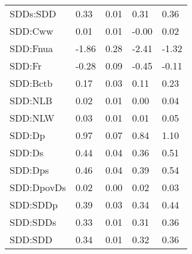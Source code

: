 \begin{center}
\begin{longtable}{|p{0.9in}|p{0.7in}|p{0.7in}|p{0.7in}|p{0.7in}|}
   SDDs:SDD & 0.33 & 0.01 & 0.31 & 0.36 \\ 
   SDD:Cww & 0.01 & 0.01 & -0.00 & 0.02 \\ 
   SDD:Fnua & -1.86 & 0.28 & -2.41 & -1.32 \\ 
   SDD:Fr & -0.28 & 0.09 & -0.45 & -0.11 \\ 
   SDD:Bctb & 0.17 & 0.03 & 0.11 & 0.23 \\ 
   SDD:NLB & 0.02 & 0.01 & 0.00 & 0.04 \\ 
   SDD:NLW & 0.03 & 0.01 & 0.01 & 0.05 \\ 
   SDD:Dp & 0.97 & 0.07 & 0.84 & 1.10 \\ 
   SDD:Ds & 0.44 & 0.04 & 0.36 & 0.51 \\ 
   SDD:Dps & 0.46 & 0.04 & 0.39 & 0.54 \\ 
   SDD:DpovDs & 0.02 & 0.00 & 0.02 & 0.03 \\ 
   SDD:SDDp & 0.39 & 0.03 & 0.34 & 0.44 \\ 
   SDD:SDDs & 0.33 & 0.01 & 0.31 & 0.36 \\ 
   SDD:SDD & 0.34 & 0.01 & 0.32 & 0.36 \\ 
   \hline
\end{longtable}
\end{center}
%

